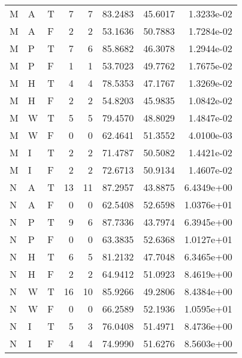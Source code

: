 \begin{tabular}{lllrrrrr}
M     & A     & T          & 7    & 7     & 83.2483    & 45.6017  & 1.3233e-02 \\
M     & A     & F          & 2    & 2     & 53.1636    & 50.7883  & 1.7284e-02 \\
M     & P     & T          & 7    & 6     & 85.8682    & 46.3078  & 1.2944e-02 \\
M     & P     & F          & 1    & 1     & 53.7023    & 49.7762  & 1.7675e-02 \\
M     & H     & T          & 4    & 4     & 78.5353    & 47.1767  & 1.3269e-02 \\
M     & H     & F          & 2    & 2     & 54.8203    & 45.9835  & 1.0842e-02 \\
M     & W     & T          & 5    & 5     & 79.4570    & 48.8029  & 1.4847e-02 \\
M     & W     & F          & 0    & 0     & 62.4641    & 51.3552  & 4.0100e-03 \\
M     & I     & T          & 2    & 2     & 71.4787    & 50.5082  & 1.4421e-02 \\
M     & I     & F          & 2    & 2     & 72.6713    & 50.9134  & 1.4607e-02 \\
N     & A     & T          & 13   & 11    & 87.2957    & 43.8875  & 6.4349e+00 \\
N     & A     & F          & 0    & 0     & 62.5408    & 52.6598  & 1.0376e+01 \\
N     & P     & T          & 9    & 6     & 87.7336    & 43.7974  & 6.3945e+00 \\
N     & P     & F          & 0    & 0     & 63.3835    & 52.6368  & 1.0127e+01 \\
N     & H     & T          & 6    & 5     & 81.2132    & 47.7048  & 6.3465e+00 \\
N     & H     & F          & 2    & 2     & 64.9412    & 51.0923  & 8.4619e+00 \\
N     & W     & T          & 16   & 10    & 85.9266    & 49.2806  & 8.4384e+00 \\
N     & W     & F          & 0    & 0     & 66.2589    & 52.1936  & 1.0595e+01 \\
N     & I     & T          & 5    & 3     & 76.0408    & 51.4971  & 8.4736e+00 \\
N     & I     & F          & 4    & 4     & 74.9990    & 51.6276  & 8.5603e+00 \\
\hline
\end{tabular}